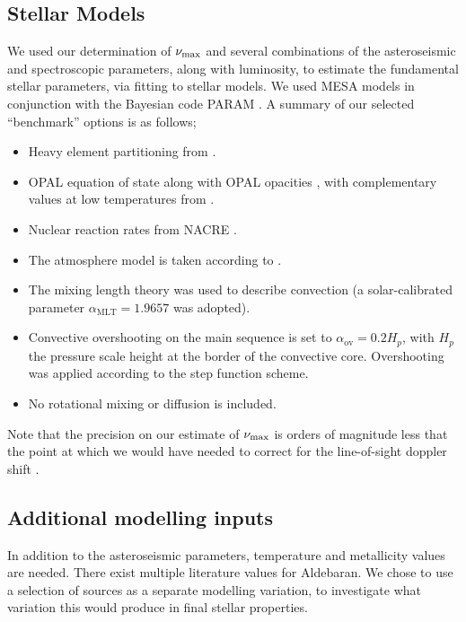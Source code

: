 \documentclass[modern]{aastex61}
\newcommand{\numax}{\mbox{$\nu_{\rm max}$}\xspace}
\begin{document}
\subsection{Stellar Models}\label{sec:stell_mod}
We used our determination of \numax and several combinations of the asteroseismic and spectroscopic parameters, along with luminosity, to estimate the fundamental stellar parameters, via fitting to stellar models. We used \textsc{MESA} models \citep{2011Paxton,2013Paxton} in conjunction with the Bayesian code \textsc{PARAM} \citep{2006dasilva, 2017Rod}.  A summary of our selected ``benchmark'' options is as follows;
\begin{itemize}%
\item Heavy element partitioning from \cite{1993Grevesse}.
\item OPAL equation of state \citep{2002Rogers} along with OPAL opacities \citep{1996Iglesias}, with complementary values at low temperatures from \cite{2005Ferguson}.
\item Nuclear reaction rates from NACRE \citep{1999Angulo}.
\item The atmosphere model is taken according to \cite{1966Kris}.
\item The mixing length theory was used to describe convection (a solar-calibrated parameter $\alpha_{\textrm{MLT}} =1.9657$ was adopted).
\item Convective overshooting on the main sequence is set to $\alpha_{\textrm{ov}}=0.2H_{p}$, with $H_{p}$ the pressure scale height at the border of the convective core. Overshooting was applied according to the \cite{1975Maeder} step function
scheme.
\item No rotational mixing or diffusion is included.
\end{itemize}
Note that the precision on our estimate of \numax is orders of magnitude less that the point at which we would have needed to correct for the line-of-sight doppler shift \citep{2014MNRAS.445L..94D}.
\subsection{Additional modelling inputs}\label{sec:addmod}
In addition to the asteroseismic parameters, temperature and metallicity values are needed. There exist multiple literature values for Aldebaran. We chose to use a selection of sources as a separate modelling variation, to investigate what variation this would produce in final stellar properties.
\end{document}
